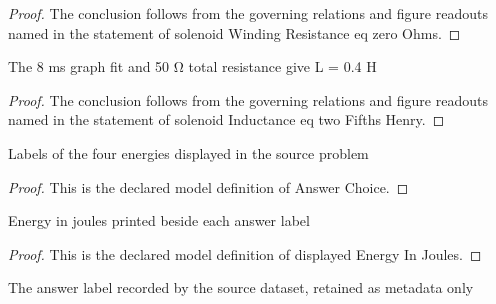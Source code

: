 \begin{proof}
  The conclusion follows from the governing relations and figure readouts named in the statement of solenoid Winding Resistance eq zero Ohms.
\end{proof}
\begin{lemma}
  \label{lem:physics:phyx-mini-0989:phyxminiproblems-problemphyxmini0989-solenoidinductance-eq-twofifthshenry}
  The 8 ms graph fit and 50 Ω total resistance give L = 0.4 H
\end{lemma}
\begin{proof}
  The conclusion follows from the governing relations and figure readouts named in the statement of solenoid Inductance eq two Fifths Henry.
\end{proof}
\begin{definition}
  \label{def:physics:phyx-mini-0989:phyxminiproblems-problemphyxmini0989-answerchoice}
  Labels of the four energies displayed in the source problem
\end{definition}
\begin{proof}
  This is the declared model definition of Answer Choice.
\end{proof}
\begin{definition}
  \label{def:physics:phyx-mini-0989:phyxminiproblems-problemphyxmini0989-displayedenergyinjoules}
  Energy in joules printed beside each answer label
\end{definition}
\begin{proof}
  This is the declared model definition of displayed Energy In Joules.
\end{proof}
\begin{definition}
  \label{def:physics:phyx-mini-0989:phyxminiproblems-problemphyxmini0989-recordeddatasetanswer}
  The answer label recorded by the source dataset, retained as metadata only
\end{definition}
